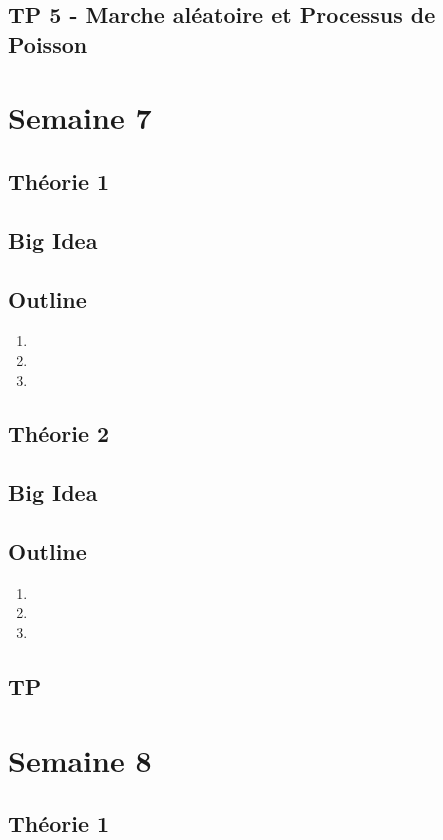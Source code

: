 \documentclass{article}
\begin{document}
\subsection{TP 5 - Marche aléatoire et Processus de Poisson}

\pagebreak
\section{Semaine 7}
\subsection{Théorie 1}
\subsection*{Big Idea}
\subsection*{Outline}
\begin{enumerate}
    \item
    \item
    \item
\end{enumerate}
\subsection{Théorie 2}
\subsection*{Big Idea}
\subsection*{Outline}
\begin{enumerate}
    \item
    \item
    \item
\end{enumerate}
\subsection{TP  }

\pagebreak
\section{Semaine 8}
\subsection{Théorie 1}
\end{document}
